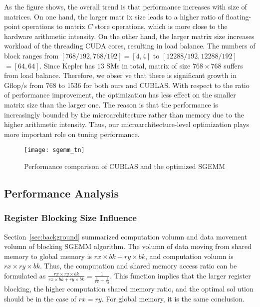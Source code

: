 As the figure shows, the overall trend is that performance increases with size of matrices. On one hand, the larger matr
ix size leads to a higher ratio of floating-point operations to matrix $C$ store operations, which is more close to the 
hardware arithmetic intensity. On the other hand, the larger matrix size increases workload of the threading CUDA cores,
 resulting in load balance. The numbers of block ranges from $[768/192,768/192]=[4,4]$ to $[12288/192, 12288/192]$ $=[64
,64]$. Since Kepler has $13$ SMs in total, matrix of size $768\times 768$ suffers from load balance. Therefore, we obser
ve that there is significant growth in Gflop/s from $768$ to $1536$ for both ours and CUBLAS. With respect to the ratio 
of performance improvement, the optimization has less effect on the smaller matrix size than the larger one. The reason 
is that the performance is increasingly bounded by the microarchitecture rather than memory due to the higher arithmetic
 intensity. Thus, our microarchitecture-level optimization plays more important role on tuning performance.

\begin{figure}[htbp]
\begin{center}
\texttt{[image: sgemm\_tn]}
\caption{Performance comparison of CUBLAS and the optimized SGEMM }
\label{fig:sgemm_tn}
\end{center}
\end{figure}

\subsection{Performance Analysis}

\subsubsection{Register Blocking Size Influence}
Section~\ref{sec:background} summarized computation volumn and data movement volumn of blocking SGEMM algorithm.
The volumn of data moving from shared memory to global memory is $rx\times bk+ ry\times bk$, and computation volumn is 
$rx\times ry\times bk$. Thus, the computation and shared memory access ratio can be formulated as 
$\frac {rx\times ry\times bk} {rx\times bk+ ry\times bk} = \frac{1}{\frac{1}{rx} + \frac{1}{ry}}$.
This function implies that the larger register blocking, the higher computation shared memory ratio, and the optimal sol
ution should be in the case of $rx=ry$. 
For global memory, it is the same conclusion.

